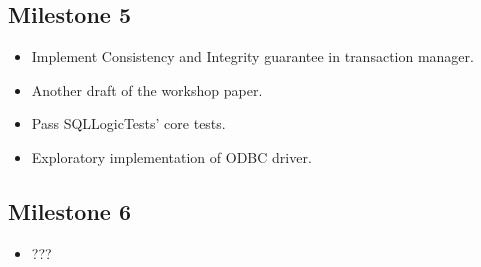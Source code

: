 \documentclass[letterpaper]{article}
\begin{document}
  \subsection{Milestone 5}
   \begin{itemize}
    \item Implement Consistency and Integrity guarantee in transaction manager.
    \item Another draft of the workshop paper.
    \item Pass SQLLogicTests' core tests.
    \item Exploratory implementation of ODBC driver.
   \end{itemize}
   \subsection{Milestone 6}
   \begin{itemize}
    \item ???
   \end{itemize}
\end{document}
